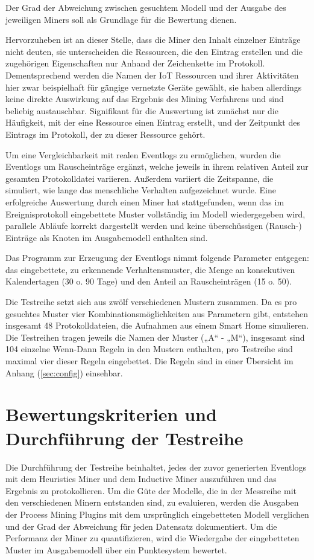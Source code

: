Der Grad der Abweichung zwischen gesuchtem Modell und der Ausgabe des jeweiligen Miners soll als Grundlage für die Bewertung dienen.

Hervorzuheben ist an dieser Stelle, dass die Miner den Inhalt einzelner Einträge nicht deuten, sie unterscheiden die Ressourcen, die den Eintrag erstellen und die zugehörigen Eigenschaften nur Anhand der Zeichenkette im Protokoll. Dementsprechend werden die Namen der IoT Ressourcen und ihrer Aktivitäten hier zwar beispielhaft für gängige vernetzte Geräte gewählt, sie haben allerdings keine direkte Auswirkung auf das Ergebnis des Mining Verfahrens und sind beliebig austauschbar. Signifikant für die Auswertung ist zunächst nur die Häufigkeit, mit der eine Ressource einen Eintrag erstellt, und der Zeitpunkt des Eintrags im Protokoll, der zu dieser Ressource gehört.

Um eine Vergleichbarkeit mit realen Eventlogs zu ermöglichen, wurden die Eventlogs um Rauscheinträge ergänzt, welche jeweils in ihrem relativen Anteil zur gesamten Protokolldatei variieren. Außerdem variiert die Zeitspanne, die simuliert, wie lange das menschliche Verhalten aufgezeichnet wurde. Eine erfolgreiche Auswertung durch einen Miner hat stattgefunden, wenn das im Ereignisprotokoll eingebettete Muster vollständig im Modell wiedergegeben wird, parallele Abläufe korrekt dargestellt werden und keine überschüssigen (Rausch-) Einträge als Knoten im Ausgabemodell enthalten sind.

Das Programm zur Erzeugung der Eventlogs nimmt folgende Parameter entgegen: das eingebettete, zu erkennende Verhaltensmuster, die Menge an konsekutiven Kalendertagen (30 o. 90 Tage) und den Anteil an Rauscheinträgen (15 o. 50). 

Die Testreihe setzt sich aus zwölf verschiedenen Mustern zusammen. Da es pro gesuchtes Muster vier Kombinationsmöglichkeiten aus Parametern gibt, entstehen insgesamt 48 Protokolldateien, die Aufnahmen aus einem Smart Home simulieren. Die Testreihen tragen jeweils die Namen der Muster („A“ - „M“), insgesamt sind 104 einzelne Wenn-Dann Regeln in den Mustern enthalten, pro Testreihe sind maximal vier dieser Regeln eingebettet. Die Regeln sind in einer Übersicht im Anhang (\ref{sec:config}) einsehbar. 

\section{Bewertungskriterien und Durchführung der Testreihe}\label{sec:tests}
Die Durchführung der Testreihe beinhaltet, jedes der zuvor generierten Eventlogs mit dem Heuristics Miner und dem Inductive Miner auszuführen und das Ergebnis zu protokollieren. Um die Güte der Modelle, die in der Messreihe mit den verschiedenen Minern entstanden sind, zu evaluieren, werden die Ausgaben der Process Mining Plugins mit dem ursprünglich eingebetteten Modell verglichen und der Grad der Abweichung für jeden Datensatz dokumentiert. Um die Performanz der Miner zu quantifizieren, wird die Wiedergabe der eingebetteten Muster im Ausgabemodell über ein Punktesystem bewertet. 

